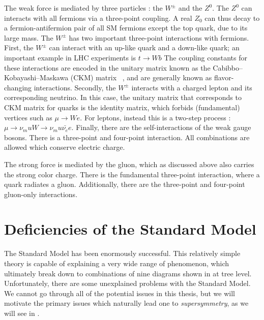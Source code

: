 The weak force is mediated by three particles : the $W^\pm$ and the $Z^0$.
The $Z^0$ can interacts with all fermions via a three-point coupling.
A real $Z_0$ can thus decay to a fermion-antifermion pair of all SM fermions except the top quark, due to its large mass.
The $W^\pm$ has two important three-point interactions with fermions.
First, the $W^\pm$ can interact with an up-like quark and a down-like quark; an important example in LHC experiments is $t \rightarrow Wb$
The coupling constants for these interactions are encoded in the unitary matrix known as the Cabibbo–Kobayashi–Maskawa (CKM) matrix ~\cite{Cabibbo:1963yz,Kobayashi:1973fv}, and are generally known as flavor-changing interactions.
Secondly, the $W^\pm$ interacts with a charged lepton and its corresponding neutrino.
In this case, the unitary matrix that corresponds to CKM matrix for quarks is the identity matrix, which forbids (fundamental) vertices such as $\mu \rightarrow We$.
For leptons, instead this is a two-step process : $\mu \rightarrow \nu_mu W \rightarrow \nu_mu \bar{\nu_e} e$.
Finally, there are the self-interactions of the weak gauge bosons.
There is a three-point and four-point interaction.
All combinations are allowed which conserve electric charge.

The strong force is mediated by the gluon, which as discussed above also carries the strong color charge.
There is the fundamental three-point interaction, where a quark radiates a gluon.
Additionally, there are the three-point and four-point gluon-only interactions.

\section{Deficiencies of the Standard Model}

The Standard Model has been enormously successful.
This relatively simple theory is capable of explaining a very wide range of phenomenon, which ultimately break down to combinations of nine diagrams shown in  at tree level.
Unfortunately, there are some unexplained problems with the Standard Model.
We cannot go through all of the potential issues in this thesis, but we will motivate the primary issues which naturally lead one to \textit{supersymmetry}, as we will see in .

